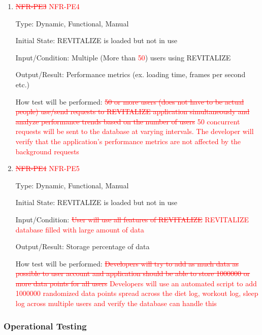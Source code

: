 \documentclass[12pt, titlepage]{article}
\begin{document}
\begin{enumerate}
	\item{\textcolor{red}{\sout{NFR-PE3}} \textcolor{red}{NFR-PE4}\\}
	
	Type: Dynamic, Functional, Manual
	
	Initial State: REVITALIZE is loaded but not in use
	
	Input/Condition: Multiple (More than \textcolor{red}{50}) users using REVITALIZE
	
	Output/Result: Performance metrics (ex. loading time, frames per second etc.)
	
	How test will be performed: \textcolor{red}{\sout{50 or more users (does not have to be actual people) use/send requests to REVITALIZE application simultaneously and analyze performance trends based on the number of users}} \textcolor{red}{50 concurrent requests will be sent to the database at varying intervals. The developer will verify that the application's performance metrics are not affected by the background requests}
	
	\item{\textcolor{red}{\sout{NFR-PE4}} \textcolor{red}{NFR-PE5}\\}
	
	Type: Dynamic, Functional, Manual
	
	Initial State: REVITALIZE is loaded but not in use
	
	Input/Condition: \textcolor{red}{\sout{User will use all features of REVITALIZE}} \textcolor{red}{REVITALIZE database filled with large amount of data}
	
	Output/Result: Storage percentage of data
	
	How test will be performed: \textcolor{red}{\sout{Developers will try to add as much data as possible to user account and application should be able to store \textcolor{red}{1000000} or more data points for all users}} \textcolor{red}{Developers will use an automated script to add 1000000 randomized data points spread across the diet log, workout log, sleep log across multiple users and verify the database can handle this}
	
\end{enumerate}

\subsubsection{Operational Testing}
\end{document}
